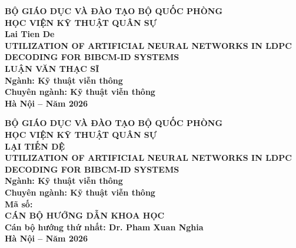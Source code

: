 \documentclass[a4paper,14pt]{extreport}
\newcommand{\titleEN}{UTILIZATION OF ARTIFICIAL NEURAL NETWORKS IN LDPC DECODING FOR BIBCM-ID SYSTEMS}
\newcommand{\authorVN}{Lai Tien De}
\newcommand{\supervisorVN}{Dr. Pham Xuan Nghia}
\begin{document}
\sloppy
{}

\thispagestyle{empty}
\begin{center}
    \textbf{BỘ GIÁO DỤC VÀ ĐÀO TẠO \hspace{2cm} BỘ QUỐC PHÒNG}\\[0.5cm]
    \textbf{HỌC VIỆN KỸ THUẬT QUÂN SỰ}\\[2cm]

    \vspace{1cm}
    {\LARGE\textbf{\authorVN}}\\[2cm]

    {\Large\textbf{\titleEN}}\\[2cm]

    {\large\textbf{LUẬN VĂN THẠC SĨ}}\\[0.5cm]
    \textbf{Ngành: Kỹ thuật viễn thông}\\
    \textbf{Chuyên ngành: Kỹ thuật viễn thông}\\

    \vfill
    \textbf{Hà Nội -- Năm 2026}
\end{center}

\newpage
\thispagestyle{empty}
\begin{center}
    \textbf{BỘ GIÁO DỤC VÀ ĐÀO TẠO \hspace{2cm} BỘ QUỐC PHÒNG}\\[0.5cm]
    \textbf{HỌC VIỆN KỸ THUẬT QUÂN SỰ}\\[2cm]

    \vspace{1cm}
    {\LARGE\textbf{LẠI TIẾN DỆ}}\\[2cm]

    {\Large\textbf{\titleEN}}\\[1.5cm]

    \textbf{Ngành: Kỹ thuật viễn thông}\\
    \textbf{Chuyên ngành: Kỹ thuật viễn thông}\\
    \textbf{Mã số: }\\[1.5cm]

    \textbf{CÁN BỘ HƯỚNG DẪN KHOA HỌC}\\[0.3cm]
    \textbf{Cán bộ hướng thứ nhất: \supervisorVN}\\

    \vfill
    \textbf{Hà Nội -- Năm 2026}
\end{center}
\end{document}
